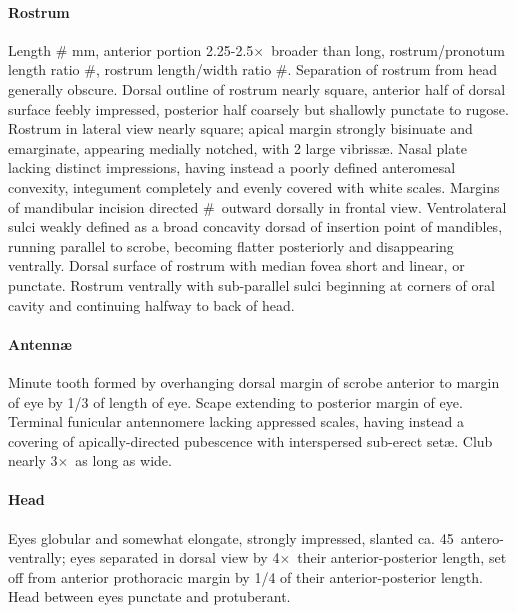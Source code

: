 \documentclass[fleqn,10pt,lineno]{wlpeerj} %
\newcommand{\td}{\textdegree~}
\newcommand{\x}{$\times$~}
\begin{document}
			\paragraph{Rostrum}
				Length \# mm, anterior portion 2.25-2.5\x broader than long, rostrum/pronotum length ratio \#, rostrum length/width ratio \#.
				Separation of rostrum from head generally obscure. 
				Dorsal outline of rostrum nearly square, anterior half of dorsal surface feebly impressed, posterior half coarsely but shallowly punctate to rugose. 
				Rostrum in lateral view nearly square; apical margin strongly bisinuate and emarginate, appearing medially notched, with 2 large vibriss{\ae}. 
				Nasal plate lacking distinct impressions, having instead a poorly defined anteromesal convexity, integument completely and evenly covered with white scales. 
				Margins of mandibular incision directed \#\td outward dorsally in frontal view. 
				Ventrolateral sulci weakly defined as a broad concavity dorsad of insertion point of mandibles, running parallel to scrobe, becoming flatter posteriorly and disappearing ventrally.
				Dorsal surface of rostrum with median fovea short and linear, or punctate.
				Rostrum ventrally with sub-parallel sulci beginning at corners of oral cavity and continuing halfway to back of head.
			\paragraph{Antenn{\ae}}
				Minute tooth formed by overhanging dorsal margin of scrobe anterior to margin of eye by 1/3 of length of eye.
				Scape extending to posterior margin of eye.
				Terminal funicular antennomere lacking appressed scales, having instead a covering of apically-directed pubescence with interspersed sub-erect set{\ae}.
				Club nearly 3\x as long as wide.
			\paragraph{Head}
				Eyes globular and somewhat elongate, strongly impressed, slanted ca. 45\td antero-ventrally; eyes separated in dorsal view by 4\x their anterior-posterior length, set off from anterior prothoracic margin by 1/4 of their anterior-posterior length. 
				Head between eyes punctate and protuberant.
\end{document}
